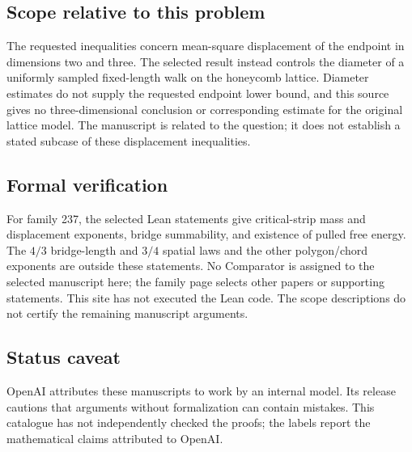 \documentclass[11pt]{article}
\begin{document}
\subsection{Scope relative to this problem}
The requested inequalities concern mean-square displacement of the endpoint in dimensions two and three. The selected result instead controls the diameter of a uniformly sampled fixed-length walk on the honeycomb lattice. Diameter estimates do not supply the requested endpoint lower bound, and this source gives no three-dimensional conclusion or corresponding estimate for the original lattice model. The manuscript is related to the question; it does not establish a stated subcase of these displacement inequalities.

\subsection{Formal verification}
For family 237, the selected Lean statements give critical-strip mass and displacement exponents, bridge summability, and existence of pulled free energy. The $4/3$ bridge-length and $3/4$ spatial laws and the other polygon/chord exponents are outside these statements. No Comparator is assigned to the selected manuscript here; the family page selects other papers or supporting statements. This site has not executed the Lean code. The scope descriptions do not certify the remaining manuscript arguments.

\subsection{Status caveat}
OpenAI attributes these manuscripts to work by an internal model. Its release cautions that arguments without formalization can contain mistakes. This catalogue has not independently checked the proofs; the labels report the mathematical claims attributed to OpenAI.
\end{document}
